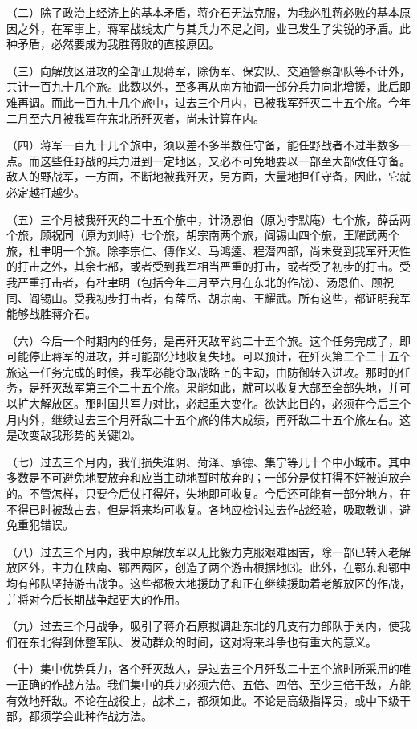 \documentclass[UTF-8, a5paper, 12pt]{ctexart}
\begin{document}
（二）除了政治上经济上的基本矛盾，蒋介石无法克服，为我必胜蒋必败的基本原因之外，在军事上，蒋军战线太广与其兵力不足之间，业已发生了尖锐的矛盾。此种矛盾，必然要成为我胜蒋败的直接原因。

（三）向解放区进攻的全部正规蒋军，除伪军、保安队、交通警察部队等不计外，共计一百九十几个旅。此数以外，至多再从南方抽调一部分兵力向北增援，此后即难再调。而此一百九十几个旅中，过去三个月内，已被我军歼灭二十五个旅。今年二月至六月被我军在东北所歼灭者，尚未计算在内。

（四）蒋军一百九十几个旅中，须以差不多半数任守备，能任野战者不过半数多一点。而这些任野战的兵力进到一定地区，又必不可免地要以一部至大部改任守备。敌人的野战军，一方面，不断地被我歼灭，另方面，大量地担任守备，因此，它就必定越打越少。

（五）三个月被我歼灭的二十五个旅中，计汤恩伯（原为李默庵）七个旅，薛岳两个旅，顾祝同（原为刘峙）七个旅，胡宗南两个旅，阎锡山四个旅，王耀武两个旅，杜聿明一个旅。除李宗仁、傅作义、马鸿逵、程潜四部，尚未受到我军歼灭性的打击之外，其余七部，或者受到我军相当严重的打击，或者受了初步的打击。受我严重打击者，有杜聿明（包括今年二月至六月在东北的作战）、汤恩伯、顾祝同、阎锡山。受我初步打击者，有薛岳、胡宗南、王耀武。所有这些，都证明我军能够战胜蒋介石。

（六）今后一个时期内的任务，是再歼灭敌军约二十五个旅。这个任务完成了，即可能停止蒋军的进攻，并可能部分地收复失地。可以预计，在歼灭第二个二十五个旅这一任务完成的时候，我军必能夺取战略上的主动，由防御转入进攻。那时的任务，是歼灭敌军第三个二十五个旅。果能如此，就可以收复大部至全部失地，并可以扩大解放区。那时国共军力对比，必起重大变化。欲达此目的，必须在今后三个月内外，继续过去三个月歼敌二十五个旅的伟大成绩，再歼敌二十五个旅左右。这是改变敌我形势的关键⑵。

（七）过去三个月内，我们损失淮阴、菏泽、承德、集宁等几十个中小城市。其中多数是不可避免地要放弃和应当主动地暂时放弃的；一部分是仗打得不好被迫放弃的。不管怎样，只要今后仗打得好，失地即可收复。今后还可能有一部分地方，在不得已时被敌占去，但是将来均可收复。各地应检讨过去作战经验，吸取教训，避免重犯错误。

（八）过去三个月内，我中原解放军以无比毅力克服艰难困苦，除一部已转入老解放区外，主力在陕南、鄂西两区，创造了两个游击根据地⑶。此外，在鄂东和鄂中均有部队坚持游击战争。这些都极大地援助了和正在继续援助着老解放区的作战，并将对今后长期战争起更大的作用。

（九）过去三个月战争，吸引了蒋介石原拟调赴东北的几支有力部队于关内，使我们在东北得到休整军队、发动群众的时间，这对将来斗争也有重大的意义。

（十）集中优势兵力，各个歼灭敌人，是过去三个月歼敌二十五个旅时所采用的唯一正确的作战方法。我们集中的兵力必须六倍、五倍、四倍、至少三倍于敌，方能有效地歼敌。不论在战役上，战术上，都须如此。不论是高级指挥员，或中下级干部，都须学会此种作战方法。
\end{document}
